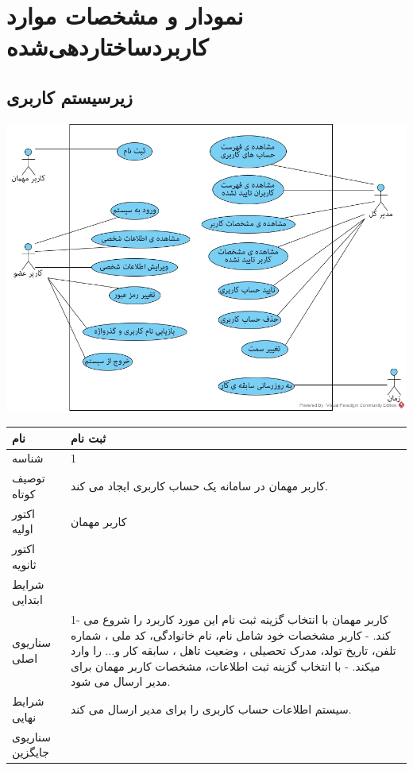 \documentclass{article}
\begin{document}
\newpage
\section{نمودار و مشخصات موارد کاربردساختاردهی‌شده}

\subsection{زیرسیستم کاربری}

\vspace{2cm}
\begin{center}
\includegraphics[width=\textwidth]{Diagrams/Accounting.jpg}
\end{center}

\newpage


\begin{tabular}{|p{2cm}|p{10cm}|}
\hline
نام
&
ثبت نام
\\
\hline
شناسه
&
1
\\
\hline
توصیف کوتاه
&
کاربر مهمان در سامانه یک حساب کاربری ایجاد می کند.
\\
\hline
اکتور اولیه
&
کاربر مهمان
\\
\hline
اکتور ثانویه
&

\\
\hline
شرایط ابتدایی
&

\\
\hline
سناریوی اصلی
&
1-	کاربر مهمان با انتخاب گزینه ثبت نام این مورد کاربرد را شروع می کند.
\newline
2-	کاربر مشخصات خود شامل نام، نام خانوادگی، کد ملی ، شماره تلفن، تاریخ تولد، مدرک تحصیلی ، وضعیت تاهل ، سابقه کار و... را وارد میکند.
\newline
3-	با انتخاب گزینه ثبت اطلاعات، مشخصات کاربر مهمان برای مدیر ارسال می شود.
\\
\hline
شرایط نهایی
&
سیستم اطلاعات حساب کاربری را برای مدیر ارسال می کند.
\\
\hline
سناریوی جایگزین
&

\\
\hline
\end{tabular}
\end{document}
